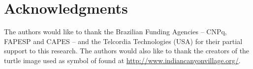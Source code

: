 
\section*{Acknowledgments}
The authors would like to thank the Brazilian Funding Agencies --
CNPq, FAPESP and CAPES -- and the Telcordia Technologies (USA) for
their partial support to this research. The authors would also
like to thank the creators of the turtle image used as symbol of
\toolname found at \url{http://www.indiancanyonvillage.org/}.
